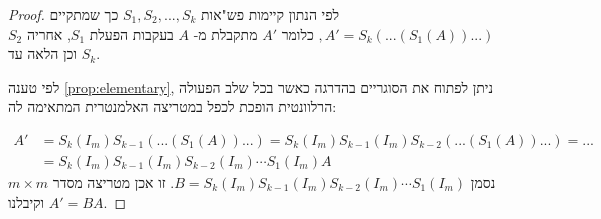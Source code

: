 \documentclass[12pt]{report}
\theoremstyle{plain}
\theoremstyle{definition}
\newcommand{\0}{\mathbf{0}}
\begin{document}
\begin{proof}
לפי הנתון קיימות פש"אות 
$S_1,S_2,...,S_k$
כך שמתקיים
$
,A'=S_k(...(S_1(A))...)
$
כלומר 
$A'$
מתקבלת
מ-
$A$
בעקבות הפעלת
$S_1$,
אחריה 
$S_2$
וכן הלאה עד
$S_k$.

לפי טענה
\ref{prop:elementary}, 
ניתן לפתוח את הסוגריים בהדרגה כאשר בכל שלב הפעולה הרלוונטית הופכת לכפל במטריצה האלמנטרית המתאימה לה:

$$
\begin{aligned}
A'&=S_k(I_m)S_{k-1}(...(S_1(A))...)=S_k(I_m)S_{k-1}(I_m)S_{k-2}(...(S_1(A))...)=...\\
&=S_k(I_m)S_{k-1}(I_m)S_{k-2}(I_m)\cdots S_1(I_m)A
\end{aligned}
$$
נסמן
$B=S_k(I_m)S_{k-1}(I_m)S_{k-2}(I_m)\cdots S_1(I_m)$.
זו אכן מטריצה מסדר 
$m\times m$
וקיבלנו
$A'=BA$.
\end{proof}
\end{document}
